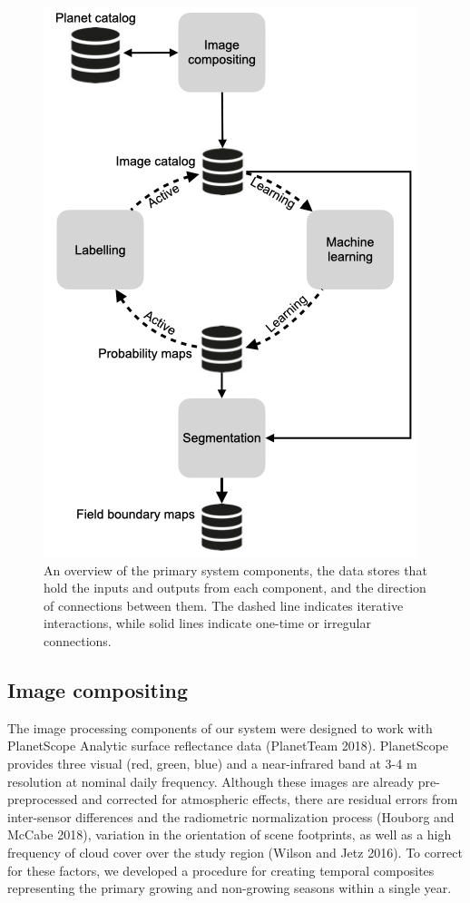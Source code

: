 \documentclass[11pt,a4paper]{article}
\begin{document}
\begin{figure}

{\centering \includegraphics[width=0.5\linewidth]{figures/figure1} 

}

\caption{An overview of the primary system components, the data stores that hold the inputs and outputs from each component, and the direction of connections between them. The dashed line indicates iterative interactions, while solid lines indicate one-time or irregular connections.}\label{fig:systemoverview}
\end{figure}

\hypertarget{image-compositing}{%
\subsection{Image compositing}\label{image-compositing}}

The image processing components of our system were designed to work with
PlanetScope Analytic surface reflectance data (PlanetTeam 2018).
PlanetScope provides three visual (red, green, blue) and a near-infrared
band at 3-4 m resolution at nominal daily frequency. Although these
images are already pre-preprocessed and corrected for atmospheric
effects, there are residual errors from inter-sensor differences and the
radiometric normalization process (Houborg and McCabe 2018), variation
in the orientation of scene footprints, as well as a high frequency of
cloud cover over the study region (Wilson and Jetz 2016). To correct for
these factors, we developed a procedure for creating temporal composites
representing the primary growing and non-growing seasons within a single
year.
\end{document}
